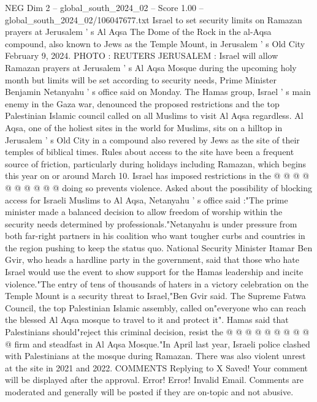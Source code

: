 \begin{textsample}{NEG Dim 2 – global\_south\_2024\_02 – Score 1.00 – global\_south\_2024\_02/106047677.txt}  \label{ex:f2_neg_409}
Israel to set security limits on Ramazan prayers at Jerusalem ' s Al Aqsa The Dome of the Rock in the al-Aqsa compound, also known to Jews as the Temple Mount, in Jerusalem ' s Old City February 9, 2024.
PHOTO : REUTERS JERUSALEM : Israel will allow Ramazan prayers at Jerusalem ' s Al Aqsa Mosque during the upcoming holy month but limits will be set according to security needs, Prime Minister Benjamin Netanyahu ' s office said on Monday.
The Hamas group, Israel ' s main enemy in the Gaza war, denounced the proposed restrictions and the top Palestinian Islamic council called on all Muslims to visit Al Aqsa regardless.
Al Aqsa, one of the holiest sites in the world for Muslims, sits on a hilltop in Jerusalem ' s Old City in a compound also revered by Jews as the site of their temples of biblical times.
Rules about access to the site have been a frequent source of friction, particularly during holidays including Ramazan, which begins this year on or around March 10.
Israel has imposed restrictions in the @ @ @ @ @ @ @ @ @ @ doing so prevents violence.
Asked about the possibility of blocking access for Israeli Muslims to Al Aqsa, Netanyahu ' s office said :"The prime minister made a balanced decision to allow freedom of worship within the security needs determined by professionals."Netanyahu is under pressure from both far-right partners in his coalition who want tougher curbs and countries in the region pushing to keep the status quo.
National Security Minister Itamar Ben Gvir, who heads a hardline party in the government, said that those who hate Israel would use the event to show support for the Hamas leadership and incite violence."The entry of tens of thousands of haters in a victory celebration on the Temple Mount is a security threat to Israel,"Ben Gvir said.
The Supreme Fatwa Council, the top Palestinian Islamic assembly, called on"everyone who can reach the blessed Al Aqsa mosque to travel to it and protect it".
Hamas said that Palestinians should"reject this criminal decision, resist the @ @ @ @ @ @ @ @ @ @ firm and steadfast in Al Aqsa Mosque."In April last year, Israeli police clashed with Palestinians at the mosque during Ramazan.
There was also violent unrest at the site in 2021 and 2022.
COMMENTS Replying to X Saved!
Your comment will be displayed after the approval.
Error!
Error!
Invalid Email.
Comments are moderated and generally will be posted if they are on-topic and not abusive.

\end{textsample}
